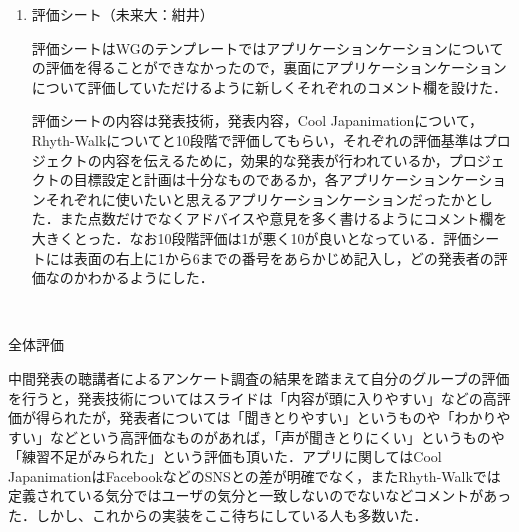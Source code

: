 \begin{enumerate}
\item 評価シート（未来大：紺井）
\par
評価シートはWGのテンプレートではアプリケーションケーションについての評価を得ることができなかったので，裏面にアプリケーションケーションについて評価していただけるように新しくそれぞれのコメント欄を設けた．
\par 評価シートの内容は発表技術，発表内容，Cool Japanimationについて，Rhyth-Walkについてと10段階で評価してもらい，それぞれの評価基準はプロジェクトの内容を伝えるために，効果的な発表が行われているか，プロジェクトの目標設定と計画は十分なものであるか，各アプリケーションケーションそれぞれに使いたいと思えるアプリケーションケーションだったかとした．また点数だけでなくアドバイスや意見を多く書けるようにコメント欄を大きくとった．なお10段階評価は1が悪く10が良いとなっている．評価シートには表面の右上に1から6までの番号をあらかじめ記入し，どの発表者の評価なのかわかるようにした．
\end{enumerate}　
\par
全体評価
\par
中間発表の聴講者によるアンケート調査の結果を踏まえて自分のグループの評価を行うと，発表技術についてはスライドは「内容が頭に入りやすい」などの高評価が得られたが，発表者については「聞きとりやすい」というものや「わかりやすい」などという高評価なものがあれば，「声が聞きとりにくい」というものや「練習不足がみられた」という評価も頂いた．アプリに関してはCool  JapanimationはFacebookなどのSNSとの差が明確でなく，またRhyth-Walkでは定義されている気分ではユーザの気分と一致しないのでないなどコメントがあった．しかし、これからの実装をここ待ちにしている人も多数いた．
